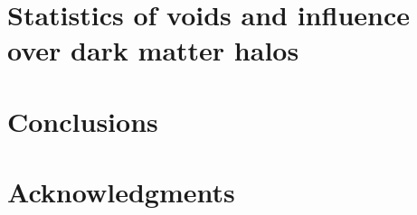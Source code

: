 \documentclass[a4,useAMS,usenatbib,usegraphicx]{latex/mn2e}
\begin{document}
 
\section{Statistics of voids and influence over dark matter halos}
\label{sec:statistics}



\section{Conclusions}
\label{sec:conclusions}


\section*{Acknowledgments}  



 
\end{document}
